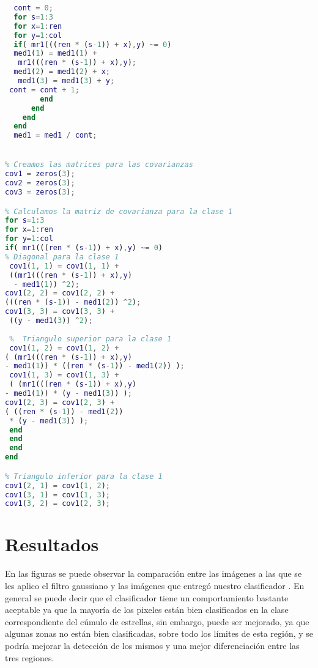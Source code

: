 \documentclass[10pt,journal,compsoc]{IEEEtran}\usepackage[T1]{fontenc}                              %
\begin{document}
\begin{lstlisting}[language=Matlab, basicstyle=\small]
  % Calculamos la media para la clase 1
  cont = 0;
  for s=1:3
  for x=1:ren
  for y=1:col
  if( mr1(((ren * (s-1)) + x),y) ~= 0)
  med1(1) = med1(1) +
   mr1(((ren * (s-1)) + x),y);
  med1(2) = med1(2) + x;
   med1(3) = med1(3) + y;
 cont = cont + 1;
        end
      end
    end
  end
  med1 = med1 / cont;


% Creamos las matrices para las covarianzas
cov1 = zeros(3);
cov2 = zeros(3);
cov3 = zeros(3);

% Calculamos la matriz de covarianza para la clase 1
for s=1:3
for x=1:ren
for y=1:col
if( mr1(((ren * (s-1)) + x),y) ~= 0)
% Diagonal para la clase 1
 cov1(1, 1) = cov1(1, 1) + 
 ((mr1(((ren * (s-1)) + x),y)
  - med1(1)) ^2);
cov1(2, 2) = cov1(2, 2) + 
(((ren * (s-1)) - med1(2)) ^2);
cov1(3, 3) = cov1(3, 3) +
 ((y - med1(3)) ^2);
            
 %  Triangulo superior para la clase 1
 cov1(1, 2) = cov1(1, 2) + 
( (mr1(((ren * (s-1)) + x),y)
- med1(1)) * ((ren * (s-1)) - med1(2)) );
 cov1(1, 3) = cov1(1, 3) +
 ( (mr1(((ren * (s-1)) + x),y)
- med1(1)) * (y - med1(3)) );
cov1(2, 3) = cov1(2, 3) + 
( ((ren * (s-1)) - med1(2))
 * (y - med1(3)) );
 end
 end
 end
end

% Triangulo inferior para la clase 1
cov1(2, 1) = cov1(1, 2);
cov1(3, 1) = cov1(1, 3);
cov1(3, 2) = cov1(2, 3);
\end{lstlisting}

\section{Resultados}


En las figuras se puede observar la comparación entre las imágenes a las que se les aplico el filtro gaussiano y las imágenes que entregó nuestro clasificador .
En general se puede decir que el clasificador tiene un comportamiento bastante aceptable ya que la mayoría de los pixeles están bien clasificados en la clase correspondiente del cúmulo de estrellas, sin embargo, puede ser mejorado, ya que algunas zonas no están bien clasificadas, sobre todo los límites de esta región, y se podría mejorar la detección de los mismos y una mejor diferenciación entre las tres regiones.

\graphicspath{{ReporteImagenes/}}
\end{document}

